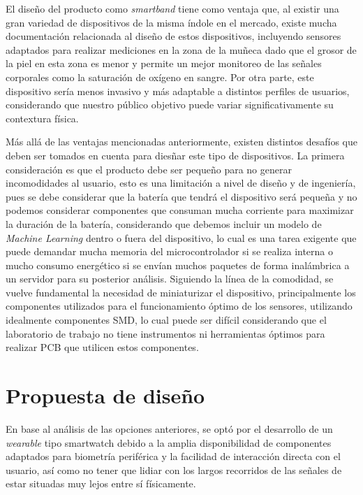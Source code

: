 \documentclass[letterpaper,11pt]{article}
\begin{document}
El diseño del producto como \textit{smartband} tiene como ventaja que, al existir una gran variedad de dispositivos de la misma índole en el mercado, existe mucha documentación relacionada al diseño de estos dispositivos, incluyendo sensores adaptados para realizar mediciones en la zona de la muñeca dado que el grosor de la piel en esta zona es menor y permite un mejor monitoreo de las señales corporales como la saturación de oxígeno en sangre. Por otra parte, este dispositivo sería menos invasivo y más adaptable a distintos perfiles de usuarios, considerando que nuestro público objetivo puede variar significativamente su contextura física.

Más allá de las ventajas mencionadas anteriormente, existen distintos desafíos que deben ser tomados en cuenta para diesñar este tipo de dispositivos. La primera consideración es que el producto debe ser pequeño para no generar incomodidades al usuario, esto es una limitación a nivel de diseño y de ingeniería, pues se debe considerar que la batería que tendrá el dispositivo será pequeña y no podemos considerar componentes que consuman mucha corriente para maximizar la duración de la batería, considerando que debemos incluir un modelo de \textit{Machine Learning} dentro o fuera del dispositivo, lo cual es una tarea exigente que puede demandar mucha memoria del microcontrolador si se realiza interna o mucho consumo energético si se envían muchos paquetes de forma inalámbrica a un servidor para su posterior análisis. Siguiendo la línea de la comodidad, se vuelve fundamental la necesidad de miniaturizar el dispositivo, principalmente los componentes utilizados para el funcionamiento óptimo de los sensores, utilizando idealmente componentes SMD, lo cual puede ser difícil considerando que el laboratorio de trabajo no tiene instrumentos ni herramientas óptimos para realizar PCB que utilicen estos componentes.


\section{Propuesta de diseño}

En base al análisis de las opciones anteriores, se optó por el desarrollo de un \textit{wearable} tipo smartwatch debido a la amplia disponibilidad de componentes adaptados para biometría periférica y la facilidad de interacción directa con el usuario, así como no tener que lidiar con los largos recorridos de las señales de estar situadas muy lejos entre sí físicamente.
\end{document}
